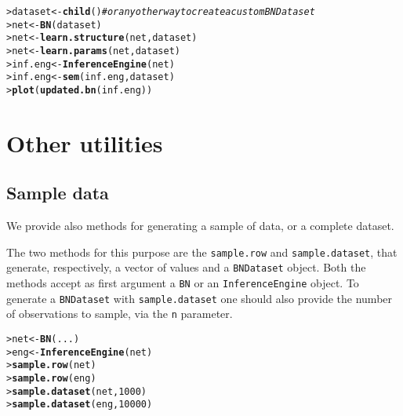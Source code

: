 \documentclass{article}\usepackage[]{graphicx}\usepackage[]{color}
\makeatletter
\newcommand{\hlnum}[1]{\textcolor[rgb]{0.686,0.059,0.569}{#1}}%
\newcommand{\hlcom}[1]{\textcolor[rgb]{0.678,0.584,0.686}{\textit{#1}}}%
\newcommand{\hlstd}[1]{\textcolor[rgb]{0.345,0.345,0.345}{#1}}%
\newcommand{\hlkwb}[1]{\textcolor[rgb]{0.69,0.353,0.396}{#1}}%
\newcommand{\hlkwd}[1]{\textcolor[rgb]{0.737,0.353,0.396}{\textbf{#1}}}%
\newenvironment{kframe}{%
 \def\at@end@of@kframe{}%
 \ifinner\ifhmode%
  \def\at@end@of@kframe{\end{minipage}}%
  \begin{minipage}{\columnwidth}%
 \fi\fi%
 \def\FrameCommand##1{\hskip\@totalleftmargin \hskip-\fboxsep
 \colorbox{shadecolor}{##1}\hskip-\fboxsep
     \hskip-\linewidth \hskip-\@totalleftmargin \hskip\columnwidth}%
 \MakeFramed {\advance\hsize-\width
   \@totalleftmargin\z@ \linewidth\hsize
   \@setminipage}}%
 {\par\unskip\endMakeFramed%
 \at@end@of@kframe}
\newenvironment{knitrout}{}{} %
\newcommand{\Robject}[1]{{\texttt{#1}}}
\newcommand{\Rmethod}[1]{{\texttt{#1}}}
\newcommand{\Rfunarg}[1]{{\texttt{#1}}}
\makeatother
\begin{document}
\begin{knitrout}
\color{fgcolor}\begin{kframe}
\begin{alltt}
\hlstd{> }\hlstd{dataset} \hlkwb{<-} \hlkwd{child}\hlstd{()} \hlcom{# or any other way to create a custom BNDataset}
\hlstd{> }\hlstd{net}     \hlkwb{<-} \hlkwd{BN}\hlstd{(dataset)}
\hlstd{> }\hlstd{net}     \hlkwb{<-} \hlkwd{learn.structure}\hlstd{(net, dataset)}
\hlstd{> }\hlstd{net}     \hlkwb{<-} \hlkwd{learn.params}\hlstd{(net, dataset)}
\hlstd{> }\hlstd{inf.eng} \hlkwb{<-} \hlkwd{InferenceEngine}\hlstd{(net)}
\hlstd{> }\hlstd{inf.eng} \hlkwb{<-} \hlkwd{sem}\hlstd{(inf.eng, dataset)}
\hlstd{> }\hlkwd{plot}\hlstd{(}\hlkwd{updated.bn}\hlstd{(inf.eng))}
\end{alltt}
\end{kframe}
\end{knitrout}


\section{Other utilities}
\subsection{Sample data}
We provide also methods for generating a sample of data, or a complete dataset.

The two methods for this purpose are the \Rmethod{sample.row} and \Rmethod{sample.dataset}, that generate, respectively,
a vector of values and a \Robject{BNDataset} object. Both the methods accept as first argument a \Robject{BN} or an
\Robject{InferenceEngine} object. To generate a \Robject{BNDataset} with \Rmethod{sample.dataset} one should also provide the
number of observations to sample, via the \Rfunarg{n} parameter.

\begin{knitrout}
\color{fgcolor}\begin{kframe}
\begin{alltt}
\hlstd{> }\hlstd{net} \hlkwb{<-} \hlkwd{BN}\hlstd{(...)}
\hlstd{> }\hlstd{eng} \hlkwb{<-} \hlkwd{InferenceEngine}\hlstd{(net)}
\hlstd{> }\hlkwd{sample.row}\hlstd{(net)}
\hlstd{> }\hlkwd{sample.row}\hlstd{(eng)}
\hlstd{> }\hlkwd{sample.dataset}\hlstd{(net,}\hlnum{1000}\hlstd{)}
\hlstd{> }\hlkwd{sample.dataset}\hlstd{(eng,}\hlnum{10000}\hlstd{)}
\end{alltt}
\end{kframe}
\end{knitrout}




\end{document}
